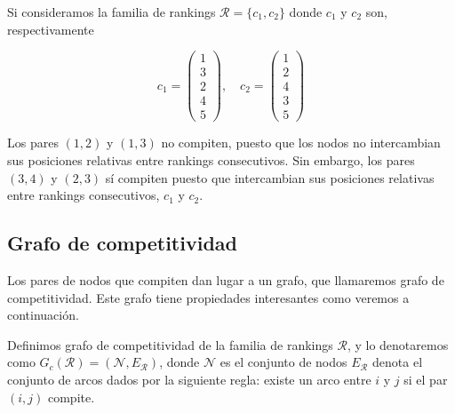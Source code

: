 \begin{ejemplo}
Si consideramos la familia de rankings $\mathcal{R} = \{c_1, c_2\}$ donde $c_1$ y $c_2$ son, respectivamente

\begin{equation*}
c_1 = \left( \begin{array}{c}
1\\
3\\
2\\
4\\
5
\end{array} \right), \quad
c_2 = \left( \begin{array}{c}
1\\
2\\
4\\
3\\
5
\end{array} \right)
\end{equation*}

Los pares $(1,2)$ y $(1,3)$ no compiten, puesto que los nodos no intercambian sus posiciones relativas entre rankings consecutivos. Sin embargo, los pares $(3,4)$ y $(2,3)$ sí compiten puesto que intercambian sus posiciones relativas entre rankings consecutivos, $c_1$ y $c_2$.
\end{ejemplo}  

\subsection{Grafo de competitividad}

Los pares de nodos que compiten dan lugar a un grafo, que llamaremos grafo de competitividad. Este grafo tiene propiedades interesantes como veremos a continuación.

\begin{defi}
Definimos grafo de competitividad de la familia de rankings $\mathcal{R}$, y lo denotaremos como $G_c(\mathcal{R}) = (\mathcal{N}, E_\mathcal{R})$, donde $\mathcal{N}$ es el conjunto de nodos $E_\mathcal{R}$ denota el conjunto de arcos dados por la siguiente regla: existe un arco entre $i$ y $j$ si el par $(i,j)$ compite.
\end{defi}

